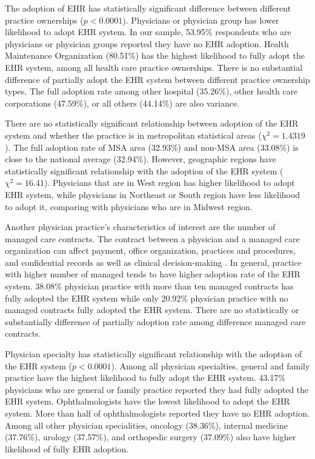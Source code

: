 \documentclass[12pt]{report}
\begin{document}
The adoption of EHR has statistically significant difference between different practice ownerships ($p<0.0001$). Physicians or physician group has lower likelihood to adopt EHR system. In our sample, 53.95\% respondents who are physicians or physician groups reported they have no EHR adoption. Health Maintenance Organization (80.51\%) has the highest likelihood to fully adopt the EHR system, among all health care practice ownerships. There is no substantial difference of partially adopt the EHR system between different practice ownership types. The full adoption rate among other hospital (35.26\%), other health care corporations (47.59\%), or all others (44.14\%) are also variance. 

There are no statistically significant relationship between adoption of the EHR system and whether the practice is in metropolitan statistical areas ($\chi^2=1.4319$). The full adoption rate of MSA area (32.93\%) and non-MSA area (33.08\%) is close to the national average (32.94\%). However, geographic regions have statistically significant relationship with the adoption of the EHR system ($\chi^2=16.41$). Physicians that are in West region has higher likelihood to adopt EHR system, while physicians in Northeast or South region have less likelihood to adopt it, comparing with physicians who are in Midwest region.

Another physician practice's characteristics of interest are the number of managed care contracts. The contract between a physician and a managed care organization can affect payment, office organization, practices and procedures, and confidential records as well as clinical decision-making \citep{mcc2008}. In general, practice with higher number of managed tends to have higher adoption rate of the EHR system. 38.08\% physician practice with more than ten managed contracts has fully adopted the EHR system while only 20.92\% physician practice with no managed contracts fully adopted the EHR system. There are no statistically or substantially difference of partially adoption rate among difference managed care contracts.

Physician specialty has statistically significant relationship with the adoption of the EHR system ($p < 0.0001$). Among all physician specialties, general and family practice have the highest likelihood to fully adopt the EHR system. 43.17\% physicians who are general or family practice reported they had fully adopted the EHR system. Ophthalmologists have the lowest likelihood to adopt the EHR system. More than half of ophthalmologists reported they have no EHR adoption. Among all other physician specialities, oncology (38.36\%), internal medicine (37.76\%), urology (37.57\%), and orthopedic surgery (37.09\%) also have higher likelihood of fully EHR adoption.
 
\end{document}
